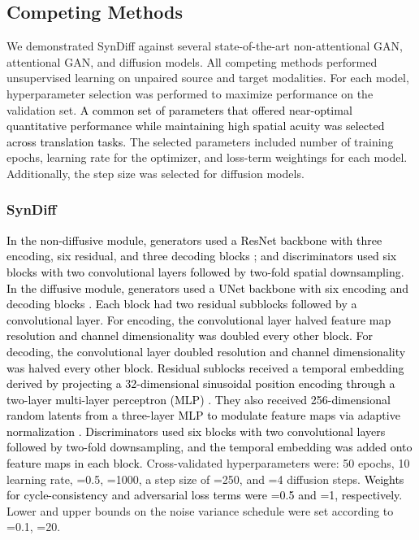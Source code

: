 \documentclass[journal,twoside,web]{ieeecolor}
\newcommand*{\revhl}{\textcolor{black}}
\begin{document}
\vspace{-0.3cm}
\subsection{Competing Methods}
We demonstrated SynDiff against several state-of-the-art non-attentional GAN, attentional GAN, and diffusion models. All competing methods performed unsupervised learning on unpaired source and target modalities. For each model, hyperparameter selection was performed to maximize performance on the validation set. \revhl{A common set of parameters that offered near-optimal quantitative performance while maintaining high spatial acuity was selected across translation tasks.} The selected parameters included number of training epochs, learning rate for the optimizer, and loss-term weightings for each model. Additionally, the step size was selected for diffusion models. 

\subsubsection{SynDiff}
\revhl{In the non-diffusive module, generators used a ResNet backbone with three encoding, six residual, and three decoding blocks \cite{he2016deep}; and discriminators used six blocks with two convolutional layers followed by two-fold spatial downsampling. In the diffusive module, generators used a UNet backbone with six encoding and decoding blocks \cite{ronneberger2015u}. Each block had two residual subblocks followed by a convolutional layer. For encoding, the convolutional layer halved feature map resolution and channel dimensionality was doubled every other block. For decoding, the convolutional layer doubled resolution and channel dimensionality was halved every other block. Residual sublocks received a temporal embedding derived by projecting a 32-dimensional sinusoidal position encoding through a two-layer multi-layer perceptron (MLP) \cite{song2020score}. They also received 256-dimensional random latents from a three-layer MLP to modulate feature maps via adaptive normalization \cite{StyleGAN1}. Discriminators used six blocks with two convolutional layers followed by two-fold downsampling, and the temporal embedding was added onto feature maps in each block.} Cross-validated hyperparameters were: 50 epochs, 10 learning rate, =0.5, =1000, a step size of =250, and =4 diffusion steps. \revhl{Weights for cycle-consistency and adversarial loss terms were =0.5 and =1, respectively.} Lower and upper bounds on the noise variance schedule were set according to =0.1, =20.
\end{document}
